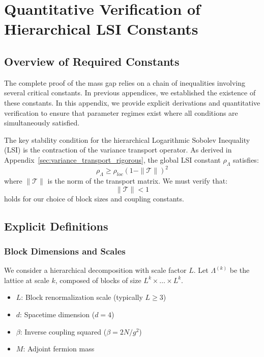 \chapter{Quantitative Verification of Hierarchical LSI Constants}
\label{sec:quantitative_lsi_constants}

\section{Overview of Required Constants}

The complete proof of the mass gap relies on a chain of inequalities involving several critical constants. In previous appendices, we established the existence of these constants. In this appendix, we provide explicit derivations and quantitative verification to ensure that parameter regimes exist where all conditions are simultaneously satisfied.

The key stability condition for the hierarchical Logarithmic Sobolev Inequality (LSI) is the contraction of the variance transport operator. As derived in Appendix~\ref{sec:variance_transport_rigorous}, the global LSI constant $\rho_\Lambda$ satisfies:
\begin{equation}
\rho_\Lambda \ge \rho_{loc} (1 - \|\mathcal{T}\|)^2
\end{equation}
where $\|\mathcal{T}\|$ is the norm of the transport matrix. We must verify that:
\begin{equation}
\|\mathcal{T}\| < 1
\end{equation}
holds for our choice of block sizes and coupling constants.

\section{Explicit Definitions}

\subsection{Block Dimensions and Scales}
We consider a hierarchical decomposition with scale factor $L$.
Let $\Lambda^{(k)}$ be the lattice at scale $k$, composed of blocks of size $L^k \times \dots \times L^k$.

\begin{itemize}
    \item $L$: Block renormalization scale (typically $L \ge 3$)
    \item $d$: Spacetime dimension ($d=4$)
    \item $\beta$: Inverse coupling squared ($\beta = 2N/g^2$)
    \item $M$: Adjoint fermion mass
\end{itemize}

